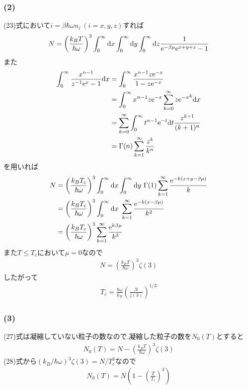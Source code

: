 \subsubsection*{(2)}
(23)式において$i=\beta\hbar\omega n_i\ (i=x,y,z)$すれば
\begin{align}
  \begin{split}
    N=\left(\frac{k_BT}{\hbar\omega}\right)^3\int_0^\infty{\rm d}x\int_0^\infty{\rm d}y\int_0^\infty{\rm d}z\frac{1}{{\rm e}^{-\beta\mu}{\rm e}^{x+y+z}-1}
  \end{split}
\end{align}
また
\begin{align}
  \begin{split}
    \int_0^\infty\frac{x^{n-1}}{z^{-1}{\rm e}^x-1}{\rm d}x&=\int_0^\infty\frac{x^{n-1}z{\rm e}^{-x}}{1-z{\rm e}^{-x}}\\
    &=\int_0^\infty x^{n-1}z{\rm e}^{-x}\sum_{k=0}^{\infty}{z{\rm e}^{-x}}^k{\rm d}x\\
    &=\sum_{k=0}^{\infty}\int_0^\infty t^{n-1}{\rm e}^{-t}{\rm d}t\frac{z^{k+1}}{(k+1)^n}\\
    &=\Gamma(n)\sum_{k=1}^\infty\frac{z^k}{k^n}
  \end{split}
\end{align}
を用いれば
\begin{align}
  \begin{split}
    N&=\left(\frac{k_BT_c}{\hbar\omega}\right)^3\int_0^\infty{\rm d}x\int_0^\infty{\rm d}y\ \Gamma(1)\sum_{k=1}^\infty\frac{{\rm e}^{-k(x+y-\beta\mu)}}{k}\\
    &=\left(\frac{k_BT_c}{\hbar\omega}\right)^3\int_0^\infty{\rm d}x\ \sum_{k=1}^\infty\frac{{\rm e}^{-k(x-\beta\mu)}}{k^{2}}\\
    &=\left(\frac{k_BT_c}{\hbar\omega}\right)^3\sum_{k=1}^\infty\frac{{\rm e}^{k\beta\mu}}{k^3}
  \end{split}
\end{align}
また$T\leq T_c$において$\mu=0$なので
\begin{align}
  N=\left(\frac{k_BT}{\hbar\omega}\right)^3\zeta(3)
\end{align}
したがって
\begin{align}
  T_c=\frac{\hbar\omega}{k_B}\left(\frac{N}{\zeta(3)}\right)^{1/3}
\end{align}
\subsubsection*{(3)}
(27)式は凝縮していない粒子の数なので,凝縮した粒子の数を$N_0(T)$とすると
\begin{align}
  N_0(T)=N-\left(\frac{k_BT}{\hbar\omega}\right)^3\zeta(3)
\end{align}
(28)式から$(k_B/\hbar\omega)^3\zeta(3)=N/T_c^3$なので
\begin{align}
  N_0(T)=N\left(1-\left(\frac{T}{T_c}\right)^3\right)
\end{align}